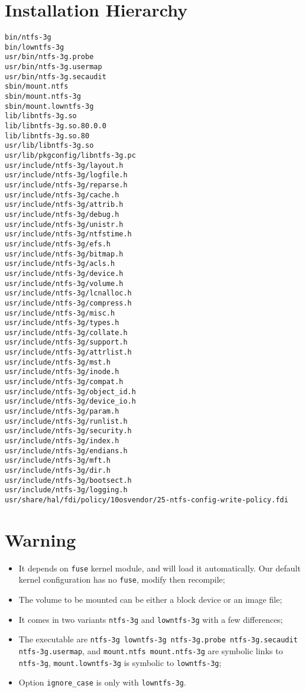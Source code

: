 \documentclass[a4paper]{report}
\begin{document}
\section{Installation Hierarchy}
\begin{lstlisting}
bin/ntfs-3g
bin/lowntfs-3g
usr/bin/ntfs-3g.probe
usr/bin/ntfs-3g.usermap
usr/bin/ntfs-3g.secaudit
sbin/mount.ntfs
sbin/mount.ntfs-3g
sbin/mount.lowntfs-3g
lib/libntfs-3g.so
lib/libntfs-3g.so.80.0.0
lib/libntfs-3g.so.80
usr/lib/libntfs-3g.so
usr/lib/pkgconfig/libntfs-3g.pc
usr/include/ntfs-3g/layout.h
usr/include/ntfs-3g/logfile.h
usr/include/ntfs-3g/reparse.h
usr/include/ntfs-3g/cache.h
usr/include/ntfs-3g/attrib.h
usr/include/ntfs-3g/debug.h
usr/include/ntfs-3g/unistr.h
usr/include/ntfs-3g/ntfstime.h
usr/include/ntfs-3g/efs.h
usr/include/ntfs-3g/bitmap.h
usr/include/ntfs-3g/acls.h
usr/include/ntfs-3g/device.h
usr/include/ntfs-3g/volume.h
usr/include/ntfs-3g/lcnalloc.h
usr/include/ntfs-3g/compress.h
usr/include/ntfs-3g/misc.h
usr/include/ntfs-3g/types.h
usr/include/ntfs-3g/collate.h
usr/include/ntfs-3g/support.h
usr/include/ntfs-3g/attrlist.h
usr/include/ntfs-3g/mst.h
usr/include/ntfs-3g/inode.h
usr/include/ntfs-3g/compat.h
usr/include/ntfs-3g/object_id.h
usr/include/ntfs-3g/device_io.h
usr/include/ntfs-3g/param.h
usr/include/ntfs-3g/runlist.h
usr/include/ntfs-3g/security.h
usr/include/ntfs-3g/index.h
usr/include/ntfs-3g/endians.h
usr/include/ntfs-3g/mft.h
usr/include/ntfs-3g/dir.h
usr/include/ntfs-3g/bootsect.h
usr/include/ntfs-3g/logging.h
usr/share/hal/fdi/policy/10osvendor/25-ntfs-config-write-policy.fdi
\end{lstlisting}
\section{Warning}
\begin{itemize}
    \item It depends on {\tt fuse} kernel module, and will load it automatically.
          Our default kernel configuration has no {\tt fuse}, modify then recompile;
    \item The volume to be mounted can be either a block device or an image file;
    \item It comes in two variants {\tt ntfs-3g} and {\tt lowntfs-3g} with a few 
          differences;
    \item The executable are {\tt ntfs-3g lowntfs-3g ntfs-3g.probe ntfs-3g.secaudit
          ntfs-3g.usermap}, and {\tt mount.ntfs mount.ntfs-3g} are symbolic links to 
          {\tt ntfs-3g}, {\tt mount.lowntfs-3g} is symbolic to {\tt lowntfs-3g};
    \item Option {\tt ignore\_case} is only with {\tt lowntfs-3g}.
\end{itemize}
\end{document}
